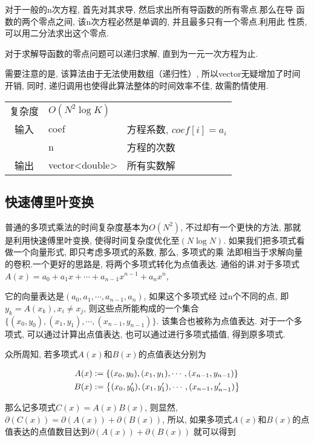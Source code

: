 对于一般的n次方程, 首先对其求导, 然后求出所有导函数的所有零点.那么在导
函数的两个零点之间, 该n次方程必然是单调的, 并且最多只有一个零点.利用此
性质, 可以用二分法求出这个零点.

对于求解导函数的零点问题可以递归求解, 直到为一元一次方程为止.

需要注意的是, 该算法由于无法使用数组（递归性）, 所以vector无疑增加了时间
开销, 同时, 递归调用也使得此算法整体的时间效率不佳, 故需酌情使用.

\begin{longtable}{|c|l|l|}
复杂度 & $O(N^{2}\log K)$ &  \\
输入 & coef & 方程系数, $coef[i] = a_{i}$ \\
 & n & 方程的次数 \\
输出 & vector<double> & 所有实数解 \\ 
\end{longtable}



    \subsection{快速傅里叶变换}\small
普通的多项式乘法的时间复杂度基本为$O(N^2)$, 不过却有一个更快的方法, 那就
是利用快速傅里叶变换, 使得时间复杂度优化至$(N\log N)$.
如果我们把多项式看做一个向量形式, 即只考虑多项式的系数, 那么, 多项式的乘
法即相当于求解向量的卷积.一个更好的思路是, 将两个多项式转化为点值表达.
通俗的讲.对于多项式
$A(x) = a_{0} + a_{1}x + \cdots + a_{n-1}x^{n-1} + a_{n}x^{n}$,

它的向量表达是$(a_{0},  a_{1}, \cdots , a_{n-1}, a_{n})$, 如果这个多项式经
过n个不同的点, 即$y_k = A(x_k), x_i \neq x_j$, 则这些点所能构成的一个集合
$\{(x_0, y_0), (x_1, y_1), \cdots , (x_{n - 1}, y_{n - 1})\}$.
该集合也被称为点值表达. 对于一个多项式, 可以通过计算出点值表达, 也可以通过进行多项式插值, 得到原多项式. 

众所周知, 若多项式$A(x)$和$B(x)$的点值表达分别为

\[ \begin{aligned}
A(x) &:= {\left\{ {(x_0, y_0), (x_1, y_1), \cdots , (x_{n - 1}, y_{n - 1})} \right\}} \\
B(x) &:= {\left\{ {(x_0, y'_0), (x_1, y'_1), \cdots , (x_{n - 1}, y'_{n - 1})} \right\}}
\end{aligned} \]

那么记多项式$C(x) = A(x)B(x)$, 则显然, $\partial (C(x)) = \partial (A(x)) + \partial (B(x))$, 所以, 如果多项式$A(x)$和$B(x)$的点值表达的点值数目达到$\partial (A(x)) + \partial (B(x))$
就可以得到

